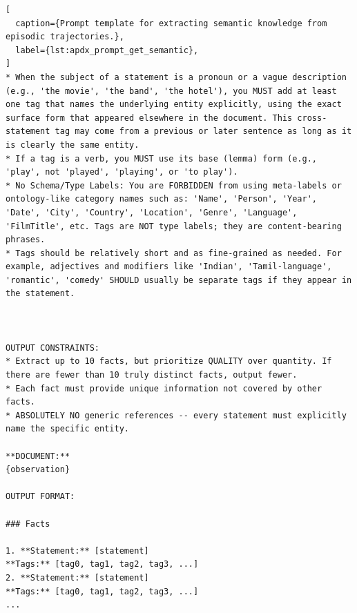 \begin{lstlisting}[
  caption={Prompt template for extracting semantic knowledge from episodic trajectories.},
  label={lst:apdx_prompt_get_semantic},
]
* When the subject of a statement is a pronoun or a vague description (e.g., 'the movie', 'the band', 'the hotel'), you MUST add at least one tag that names the underlying entity explicitly, using the exact surface form that appeared elsewhere in the document. This cross-statement tag may come from a previous or later sentence as long as it is clearly the same entity.
* If a tag is a verb, you MUST use its base (lemma) form (e.g., 'play', not 'played', 'playing', or 'to play').
* No Schema/Type Labels: You are FORBIDDEN from using meta-labels or ontology-like category names such as: 'Name', 'Person', 'Year', 'Date', 'City', 'Country', 'Location', 'Genre', 'Language', 'FilmTitle', etc. Tags are NOT type labels; they are content-bearing phrases.
* Tags should be relatively short and as fine-grained as needed. For example, adjectives and modifiers like 'Indian', 'Tamil-language', 'romantic', 'comedy' SHOULD usually be separate tags if they appear in the statement.



OUTPUT CONSTRAINTS:
* Extract up to 10 facts, but prioritize QUALITY over quantity. If there are fewer than 10 truly distinct facts, output fewer.
* Each fact must provide unique information not covered by other facts.
* ABSOLUTELY NO generic references -- every statement must explicitly name the specific entity.

**DOCUMENT:**
{observation}

OUTPUT FORMAT:

### Facts

1. **Statement:** [statement]
**Tags:** [tag0, tag1, tag2, tag3, ...]
2. **Statement:** [statement]
**Tags:** [tag0, tag1, tag2, tag3, ...]
...

\end{lstlisting}
